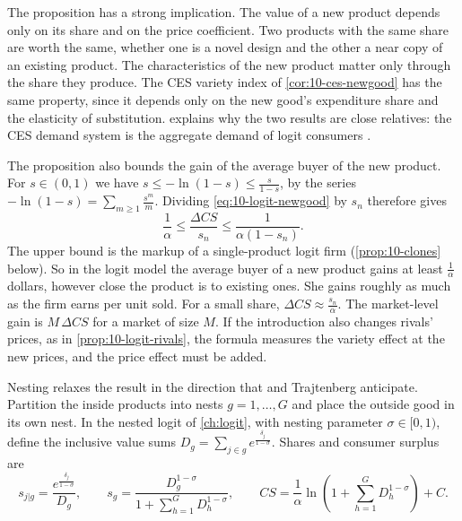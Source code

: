 The proposition has a strong implication. The value of a new product depends only on its share and on the
price coefficient. Two products with the same share are worth the same, whether one is a novel design and the
other a near copy of an existing product. The characteristics of the new product matter only through the share
they produce. The CES variety index of \cref{cor:10-ces-newgood} has the same property, since it depends only on
the new good's expenditure share and the elasticity of substitution.  explains why the
two results are close relatives: the CES demand system is the aggregate demand of logit consumers
\citep{AndersonDePalmaThisse1992}.

The proposition also bounds the gain of the average buyer of the new product. For $s \in (0,1)$ we have
$s \le -\ln(1 - s) \le \frac{s}{1-s}$, by the series $-\ln(1-s) = \sum_{m\ge1}\frac{s^m}{m}$. Dividing
\eqref{eq:10-logit-newgood} by $s_n$ therefore gives
\begin{equation}\label{eq:10-logit-perbuyer}
\frac{1}{\alpha} \le \frac{\Delta CS}{s_n} \le \frac{1}{\alpha(1 - s_n)} .
\end{equation}
The upper bound is the markup of a single-product logit firm (\cref{prop:10-clones} below). So in the logit
model the average buyer of a new product gains at least $\frac{1}{\alpha}$ dollars, however close the product is
to existing ones. She gains roughly as much as the firm earns per unit sold. For a small share, $\Delta CS \approx
\frac{s_n}{\alpha}$. The market-level gain is $M\,\Delta CS$ for a market of size $M$. If the introduction also
changes rivals' prices, as in \cref{prop:10-logit-rivals}, the formula measures the variety effect at the new
prices, and the price effect must be added.

Nesting relaxes the result in the direction that \citet{Bresnahan1997} and Trajtenberg anticipate. Partition the
inside products into nests $g = 1,\dots,G$ and place the outside good in its own nest. In the nested logit of
\cref{ch:logit}, with nesting parameter $\sigma\in[0,1)$, define the inclusive value sums
$D_g = \sum_{j\in g}e^{\frac{\delta_j}{1-\sigma}}$. Shares and consumer surplus are
\begin{equation}\label{eq:10-nl-shares}
s_{j|g} = \frac{e^{\frac{\delta_j}{1-\sigma}}}{D_g},
\qquad
s_g = \frac{D_g^{1-\sigma}}{1 + \sum_{h=1}^{G}D_h^{1-\sigma}},
\qquad
CS = \frac{1}{\alpha}\ln\left(1 + \sum_{h=1}^{G}D_h^{1-\sigma}\right) + C .
\end{equation}

